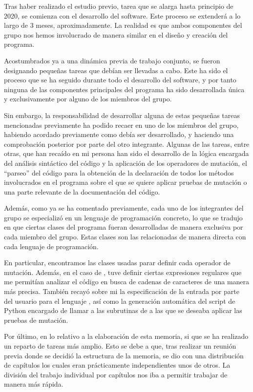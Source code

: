 Tras haber realizado el estudio previo, tarea que se alarga hasta principio de 2020, se comienza con el desarrollo del software. Este proceso se extenderá a lo largo de 3 meses, aproximadamente. La realidad es que ambos componentes del grupo nos hemos involucrado de manera similar en el diseño y creación del programa.

Acostumbrados ya a una dinámica previa de trabajo conjunto, se fueron designando pequeñas tareas que debían ser llevadas a cabo. Este ha sido el proceso que se ha seguido durante todo el desarrollo del software, y por tanto ninguna de las componentes principales del programa ha sido desarrollada única y exclusivamente por alguno de los miembros del grupo.

Sin embargo, la responsabilidad de desarrollar alguna de estas pequeñas tareas mencionadas previamente ha podido recaer en uno de los miembros del grupo, habiendo acordado previamente como debía ser desarrollado, y haciendo una comprobación posterior por parte del otro integrante. Algunas de las tareas, entre otras, que han recaído en mi persona han sido el desarrollo de la lógica encargada del análisis sintáctico del código y la aplicación de los operadores de mutación, el ``parseo'' del código para la obtención de la declaración de todos los métodos involucrados en el programa sobre el que se quiere aplicar pruebas de mutación o una parte relevante de la documentación del código. 

Además, como ya se ha comentado previamente, cada uno de los integrantes del grupo se especializó en un lenguaje de programación concreto, lo que se tradujo en que ciertas clases del programa fueran desarrolladas de manera exclusiva por cada miembro del grupo. Estas clases son las relacionadas de manera directa con cada lenguaje de programación. 

En particular, encontramos las clases usadas parar definir cada operador de mutación. Además, en el caso de \qsh, tuve definir ciertas expresiones regulares que me permitían analizar el código en busca de cadenas de caracteres de una manera más precisa. También recayó sobre mi la especificación de la entrada por parte del usuario para el lenguaje \qsh, así como la generación automática del script de Python encargado de llamar a las subrutinas de \qsh a las que se deseaba aplicar las pruebas de mutación.

Por último, en lo relativo a la elaboración de esta memoria, si que se ha realizado un reparto de tareas más amplio. Esto se debe a que, tras realizar un reunión previa donde se decidió la estructura de la memoria, se dio con una distribución de capítulos los cuales eran prácticamente independientes unos de otros. La división del trabajo individual por capítulos nos iba a permitir trabajar de manera más rápida. 

